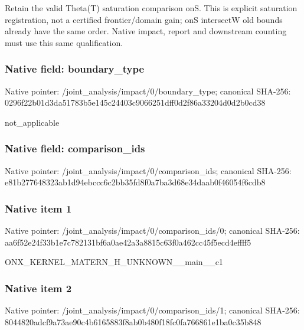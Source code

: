 \documentclass[10pt,a4paper]{article}
\begin{document}
\begingroup\raggedright\sloppy Retain the valid Theta(T) saturation comparison onS. This is explicit saturation registration,\allowbreak{} not a certified frontier/\allowbreak{}domain gain;\allowbreak{} onS intersectW old bounds already have the same order. Native impact,\allowbreak{} report and downstream counting must use this same qualification.\par\endgroup

\subsubsection{Native field: boundary\_\allowbreak{}type}
Native pointer: /joint\_\allowbreak{}analysis/impact/0/boundary\_\allowbreak{}type; canonical SHA-256: 0296f22b01d3da51783b5e145c24403c9066251dff0d2f86a33204d0d2b0cd38

\begingroup\raggedright\sloppy not\_\allowbreak{}applicable\par\endgroup

\subsubsection{Native field: comparison\_\allowbreak{}ids}
Native pointer: /joint\_\allowbreak{}analysis/impact/0/comparison\_\allowbreak{}ids; canonical SHA-256: e81b277648323ab1d94ebccc6c2bb35fd8f0a7ba3d68e34daab0f46054f6cdb8

\subsubsection{Native item 1}
Native pointer: /joint\_\allowbreak{}analysis/impact/0/comparison\_\allowbreak{}ids/0; canonical SHA-256: aa6f52e24f33b1e7c782131bf6a0ae42a3a8815c63f0a462cc45f5ecd4effff5

\begingroup\raggedright\sloppy ONX\_\allowbreak{}KERNEL\_\allowbreak{}MATERN\_\allowbreak{}H\_\allowbreak{}UNKNOWN\_\allowbreak{}\_\allowbreak{}main\_\allowbreak{}\_\allowbreak{}c1\par\endgroup

\subsubsection{Native item 2}
Native pointer: /joint\_\allowbreak{}analysis/impact/0/comparison\_\allowbreak{}ids/1; canonical SHA-256: 8044820adcf9a73ae90c4b6165883f8ab0b480f18fc0fa766861e1ba0c35b848
\end{document}
